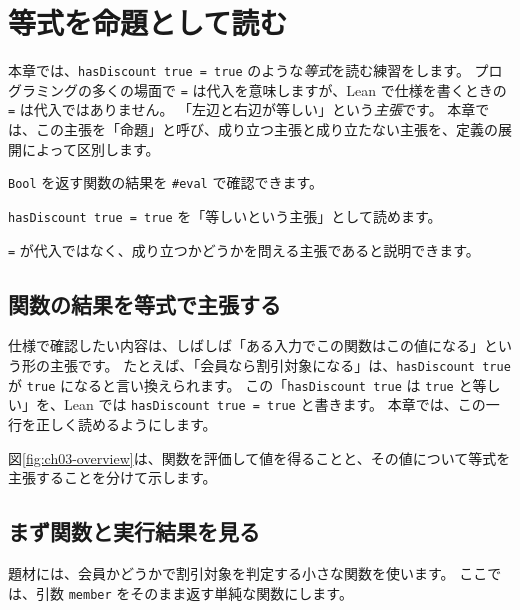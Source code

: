 \chapter{等式を命題として読む}
\label{chap:ch03_equations_as_props}

\begin{chapterabstract}
本章では、\texttt{hasDiscount true = true} のような\emph{等式}を読む練習をします。
プログラミングの多くの場面で \texttt{=} は代入を意味しますが、Lean で仕様を書くときの \texttt{=} は代入ではありません。
「左辺と右辺が等しい」という\emph{主張}です。
本章では、この主張を「命題」と呼び、成り立つ主張と成り立たない主張を、定義の展開によって区別します。
\end{chapterabstract}

\begin{learninggoals}
\item \texttt{Bool} を返す関数の結果を \texttt{\#eval} で確認できます。
\item \texttt{hasDiscount true = true} を「等しいという主張」として読めます。
\item \texttt{=} が代入ではなく、成り立つかどうかを問える主張であると説明できます。
\end{learninggoals}

\section{関数の結果を等式で主張する}

仕様で確認したい内容は、しばしば「ある入力でこの関数はこの値になる」という形の主張です。
たとえば、「会員なら割引対象になる」は、\texttt{hasDiscount true} が \texttt{true} になると言い換えられます。
この「\texttt{hasDiscount true} は \texttt{true} と等しい」を、Lean では \texttt{hasDiscount true = true} と書きます。
本章では、この一行を正しく読めるようにします。

図\ref{fig:ch03-overview}は、関数を評価して値を得ることと、その値について等式を主張することを分けて示します。


\section{まず関数と実行結果を見る}

題材には、会員かどうかで割引対象を判定する小さな関数を使います。
ここでは、引数 \texttt{member} をそのまま返す単純な関数にします。

